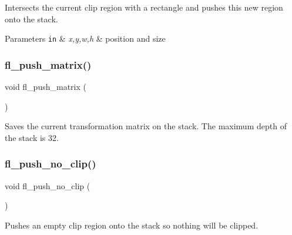 Intersects the current clip region with a rectangle and pushes this new region onto the stack. 
\begin{DoxyParams}[1]{Parameters}
\mbox{\tt in}  & {\em x,y,w,h} & position and size \\
\hline
\end{DoxyParams}
\mbox{\label{group__fl__drawings_gac6aa24b9ddc4d79a2e357ea812563a91}} 
\subsubsection{\texorpdfstring{fl\+\_\+push\+\_\+matrix()}{fl\_push\_matrix()}}
{\footnotesize\ttfamily void fl\+\_\+push\+\_\+matrix (\begin{DoxyParamCaption}{ }\end{DoxyParamCaption})\hspace{0.3cm}{\ttfamily [inline]}}

Saves the current transformation matrix on the stack. The maximum depth of the stack is 32. \mbox{\label{group__fl__drawings_ga0fce6c81d69c3a80c8073a338f1346fd}} 
\subsubsection{\texorpdfstring{fl\+\_\+push\+\_\+no\+\_\+clip()}{fl\_push\_no\_clip()}}
{\footnotesize\ttfamily void fl\+\_\+push\+\_\+no\+\_\+clip (\begin{DoxyParamCaption}{ }\end{DoxyParamCaption})\hspace{0.3cm}{\ttfamily [inline]}}

Pushes an empty clip region onto the stack so nothing will be clipped. \mbox{\label{group__fl__drawings_ga0cdc05d3f7689e1c6b8a26fd0bd97233}} 
